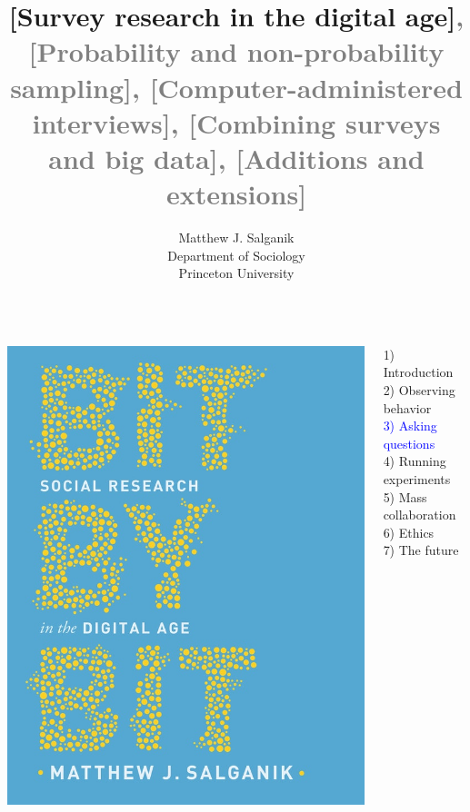\documentclass[aspectratio=169]{beamer}
\title[]{[Survey research in the digital age]\textcolor{gray}{, [Probability and non-probability sampling], [Computer-administered interviews], [Combining surveys and big data], [Additions and extensions]}}
\author[]{Matthew J. Salganik\\Department of Sociology\\Princeton University}
\date[]{%
\begin{flushright}
\vfill
\texttt{[image: figures/cc-by.png]}
\end{flushright}
}
\begin{document}
\frame{\titlepage}
\begin{frame}

\begin{columns}
\begin{column}{.40\textwidth}
\includegraphics[width=\textwidth]{figures/salganik_bit_2018_cover}
\end{column}%

\hfill%

\begin{column}{.60\textwidth}
1) Introduction \\
2) Observing behavior \\
\textcolor{blue}{3) Asking questions} \\
4) Running experiments \\
5) Mass collaboration \\
6) Ethics \\
7) The future \\
\end{column}%
\end{columns}

\end{frame}
\end{document}
